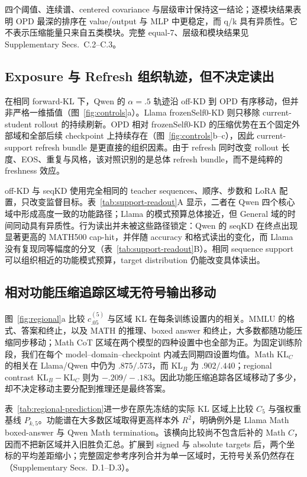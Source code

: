 四个阈值、连续谱、centered covariance 与层级审计保持这一结论；逐模块结果表明 OPD 最深的排序在 value/output 与 MLP 中更稳定，而 q/k 具有异质性。它不表示压缩能量只来自五类模块。完整 equal-7、层级和模块结果见 Supplementary Secs.~C.2--C.3。

\subsection{Exposure 与 Refresh 组织轨迹，但不决定读出}

在相同 forward-KL 下，Qwen 的 $\alpha=.5$ 轨迹沿 off-KD 到 OPD 有序移动，但并非严格一维插值（图~\ref{fig:controls}a）。Llama frozenSelf0-KD 则只移除 current-student rollout 的持续刷新。OPD 相对 frozenSelf0-KD 的压缩优势在五个固定外部域和全部后续 checkpoint 上持续存在（图~\ref{fig:controls}b--c），因此 current-support refresh bundle 是更直接的组织因素。由于 refresh 同时改变 rollout 长度、EOS、重复与风格，该对照识别的是总体 refresh bundle，而不是纯粹的 freshness 效应。

off-KD 与 seqKD 使用完全相同的 teacher sequences、顺序、步数和 LoRA 配置，只改变监督目标。表~\ref{tab:support-readout}A 显示，二者在 Qwen 四个核心域中形成高度一致的功能路径；Llama 的模式预算总体接近，但 General 域的时间同动具有异质性。行为读出并未被这些路径锁定：Qwen 的 seqKD 在终点出现显著更高的 MATH500 cap-hit，并伴随 accuracy 和格式读出的变化，而 Llama 没有复现同等幅度的分叉（表~\ref{tab:support-readout}B）。相同 sequence support 可以组织相近的功能模式预算，target distribution 仍能改变具体读出。

\subsection{相对功能压缩追踪区域无符号输出移动}

图~\ref{fig:regional}a 比较 $c_{.05}^{(5)}$ 与区域 KL 在每条训练设置内的相关。MMLU 的格式、答案和终止，以及 MATH 的推理、boxed answer 和终止，大多数都随功能压缩同步移动；Math CoT 区域在两个模型的四种设置中也全部为正。为固定训练阶段，我们在每个 model--domain--checkpoint 内减去同期四设置均值。Math $\mathrm{KL}_C$ 的相关在 Llama/Qwen 中仍为 $.875/.573$，而 $\mathrm{KL}_B$ 为 $.902/.440$；regional contrast $\mathrm{KL}_B-\mathrm{KL}_C$ 则为 $-.209/-.183$。因此功能压缩追踪各区域移动了多少，却不决定移动主要分配到推理还是最终答案。

表~\ref{tab:regional-prediction}进一步在原先冻结的实际 KL 区域上比较 $C_5$ 与强权重基线 $P_{k,5}$。功能谱在大多数区域取得更高样本外 $R^2$，明确例外是 Llama Math boxed-answer 与 Qwen Math termination。该横向比较尚不包含后补的 Math $C$，因而不把新区域并入旧胜负汇总。扩展到 signed 与 absolute targets 后，两个坐标的平均差距缩小；完整固定参考序列合并为单一区域时，无符号关系仍然存在（Supplementary Secs.~D.1--D.3）。

